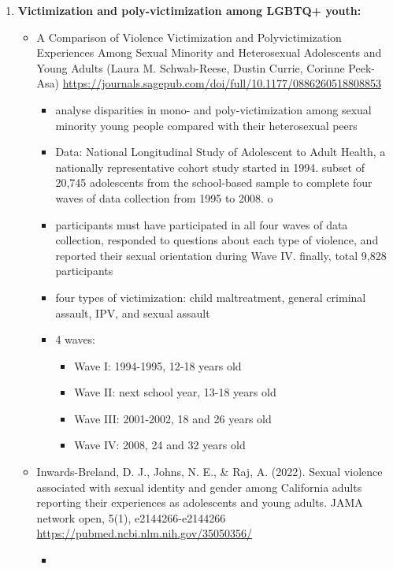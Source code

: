 \documentclass[letterpaper, 10pt]{article}
\begin{document}
\begin{enumerate}
    \item \textbf{Victimization and poly-victimization among LGBTQ+ youth:}
    \begin{itemize}
        \item A Comparison of Violence Victimization and Polyvictimization Experiences Among Sexual Minority and Heterosexual Adolescents and Young Adults (Laura M. Schwab-Reese, Dustin Currie, Corinne Peek-Asa) \url{https://journals.sagepub.com/doi/full/10.1177/0886260518808853}
        \begin{itemize}
            \item analyse disparities in mono- and poly-victimization among sexual minority young people compared with their heterosexual peers
            \item Data: National Longitudinal Study of Adolescent to Adult Health, a nationally representative cohort study started in 1994. subset of 20,745 adolescents from the school-based sample to complete four waves of data collection from 1995 to 2008. o  
            \item participants must have participated in all four waves of data collection, responded to questions about each type of violence, and reported their sexual orientation during Wave IV. finally, total 9,828 participants 
            \item four types of victimization: child maltreatment, general criminal assault, IPV, and sexual assault
            \item 4 waves: 
            \begin{itemize}
                \item Wave I: 1994-1995, 12-18 years old
                \item Wave II: next school year, 13-18 years old
                \item Wave III: 2001-2002, 18 and 26 years old
                \item Wave IV: 2008, 24 and 32 years old
            \end{itemize}
        \end{itemize} 
        \item Inwards-Breland, D. J., Johns, N. E., \& Raj, A. (2022). Sexual violence associated with sexual identity and gender among California adults reporting their experiences as adolescents and young adults. JAMA network open, 5(1), e2144266-e2144266 \url{https://pubmed.ncbi.nlm.nih.gov/35050356/}
        \begin{itemize}
            \item 

\end{itemize}
\end{itemize}
\end{enumerate}
\end{document}
